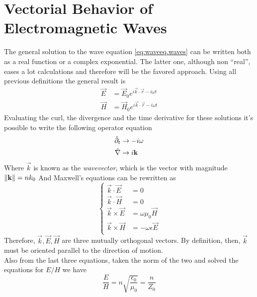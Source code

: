 \documentclass[../electromagnetism.tex]{subfiles}
\begin{document}
\section{Vectorial Behavior of Electromagnetic Waves}
The general solution to the wave equation \eqref{eq:waveeq.waves} can be written both as a real function or a complex exponential. The latter one, although non ``real'', eases a lot calculations and therefore will be the favored approach. Using all previous definitions the general result is
\begin{equation}
	\begin{aligned}
		\vec{E}&= \vec{E}_0e^{i\vec{k}\cdot\vec{r}-i\omega t}\\
		\vec{H}&= \vec{H}_0e^{i\vec{k}\cdot\vec{r}-i\omega t}
	\end{aligned}
	\label{eq:wavesolution.waves}
\end{equation}
Evaluating the curl, the divergence and the time derivative for these solutions it's possible to write the following operator equation
\begin{equation}
	\begin{aligned}
		\hat{\partial}_t&\to-i\omega\\
		\hat{\nabla}&\to i\mathbf{k}
	\end{aligned}
	\label{eq:operatorrel.waves}
\end{equation}
Where $\vec{k}$ is known as the \textit{wavevector}, which is the vector with magnitude $\norm{\mathbf{k}}=nk_0$
And Maxwell's equations can be rewritten as
\begin{equation}
	\left\{ \begin{aligned}
			\vec{k}\cdot\vec{E}&= 0\\
			\vec{k}\cdot\vec{H}&= 0\\
			\vec{k}\times\vec{E}&= \omega\mu_0\vec{H}\\
			\vec{k}\times\vec{H}&= -\omega\epsilon\vec{E}\\
	\end{aligned}\right.
	\label{eq:maxwellktimes.waves}
\end{equation}
Therefore, $\vec{k},\vec{E},\vec{H}$ are three mutually orthogonal vectors. By definition, then, $\vec{k}$ must be oriented parallel to the direction of motion.\\
Also from the last three equations, taken the norm of the two and solved the equations for $E/H$ we have
\begin{equation}
	\frac{E}{H}=n\sqrt{\frac{\epsilon_0}{\mu_0}}=\frac{n}{Z_0}
	\label{eq:impedancefs.waves}
\end{equation}
\end{document}
